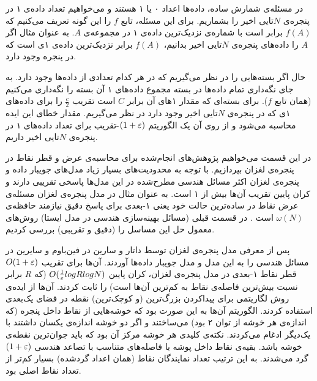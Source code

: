 در مسئله‌ی شمارش ساده، داده‌ها اعداد ۰ یا ۱ هستند و می‌خواهیم تعداد داده‌ی ۱ در پنجره‌ی $N$تایی اخیر را بشماریم. برای این مسئله، تابع $f$ را این گونه تعریف می‌کنیم که $f(A) $ برابر است با شماره‌ی نزدیک‌ترین داده‌ی ۱ در مجموعه‌ی $A$. به عنوان مثال اگر $A$ را داده‌های پنجره‌ی $N$تایی اخیر بدانیم،‌ $f(A)$ برابر نزدیک‌ترین داده‌ی ۱ی است که در پنجره وجود دارد.

حال اگر بسته‌هایی را در نظر می‌گیریم که در هر کدام تعدادی از داده‌ها وجود دارد. به جای نگه‌داری تمام داده‌ها در بسته مجموع داده‌های ۱ آن بسته را نگه‌داری می‌کنیم (همان تابع $f$). برای بسته‌ای که مقدار ۱‌های آن برابر $C$ است تقریب $\frac{c}{2}$ را برای داده‌های ۱ی که در پنجره‌ی $N$تایی اخیر وجود دارد در نظر می‌گیریم. مقدار خطای این ایده محاسبه می‌شود و از روی آن  یک الگوریتم $(1+\varepsilon)$-تقریب برای تعداد داده‌های ۱ در پنجره‌ی $N$تایی اخیر داریم.

در این قسمت می‌خواهیم پژوهش‌های انجام‌شده برای محاسبه‌ی عرض و قطر نقاط در پنجره‌ی لغزان بپردازیم. با توجه به محدودیت‌های بسیار زیاد مدل‌های جویبار داده و پنجره‌ی لغزان اکثر مسائل هندسی مطرح‌شده در این مدل‌ها پاسخی تقریبی دارند و کران پایین تقریب آن‌ها بیش از ۱ است. به عنوان مثال در مدل پنجره‌ی لغزان مسئله‌ی عرض نقاط در ساده‌ترین حالت خود یعنی ۱-بعدی برای پاسخ دقیق نیازمند حافظه‌ی $\omega(N)$ است . 
در قسمت قبلی (مسائل بهینه‌سازی هندسی در مدل ایستا) روش‌های معمول حل این مساسل را (دقیق و تقریبی) بررسی کردیم.

پس از معرفی مدل پنجره‌ی لغزان توسط داتار و سارین در
\cite{datar2002maintaining}
فین‌باوم و سایرین در
مسائل هندسی را به این مدل و مدل جویبار داده‌ها آوردند. آن‌ها برای تقریب $O(1+\varepsilon)$ قطر نقاط ۱-بعدی در مدل پنجره‌ی لغزان، کران پایین
$O(\frac{1}{\varepsilon} log R log N)$
(که $R$ برابر نسبت بیش‌ترین فاصله‌ی نقاط به کم‌ترین آن‌ها است) را ثابت کردند. آن‌ها از ایده‌ی روش لگاریتمی     برای پیداکردن بزرگ‌ترین (و کوچک‌ترین) نقطه در فضای یک‌بعدی استفاده کردند. الگوریتم آن‌ها به این صورت بود که خوشه‌هایی از نقاط داخل پنجره (که اندازه‌ی هر خوشه از توان ۲ بود) می‌ساختند و اگر دو خوشه اندازه‌ی یکسان داشتند با یک‌دیگر ادغام می‌کردند. نکته‌ی کلیدی هر خوشه مرکز آن بود که باید جوان‌ترین نقطه‌ی خوشه باشد. بقیه‌ی نقاط داخل پوشه با فاصله‌های متناسب با تصاعد هندسی $(1+\varepsilon)$ گرد می‌شدند. به این ترتیب تعداد نمایندگان نقاط (همان اعداد گرد‌شده) بسیار کم‌تر از تعداد نقاط اصلی بود.


